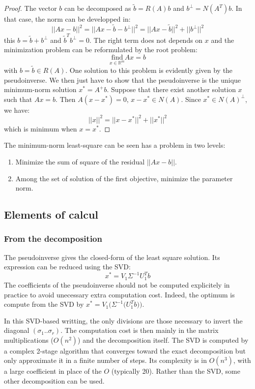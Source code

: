 \documentclass{book}
\begin{document}
\begin{proof}
The vector $b$ can be decomposed as $\tilde b = R(A) b$ and  $b^\perp = N(A^T) b$. In that case, the norm can be developped in:
$$ || A x - b ||^2 = || A x - \tilde{b} - b^\perp ||^2 = || A x - \tilde{b} ||^2 + || b^\perp ||^2 $$
this $b=\tilde{b}+b^\perp$ and $\tilde{b}^T b^\perp=0$. The right term does not depends on $x$ and the minimization problem can be reformulated by the root problem:
$$ \underset{x\in\mathbb{R}^m}{\textrm{find}}   A x = b$$
with $b = \tilde b \in R(A)$. One solution to this problem is evidently given by the pseudoinverse. We then just have to show that the pseudoinverse is the unique minimum-norm solution $x^* = A^+ b$. Suppose that there exist another solution $x$ such that $Ax=b$. Then $A(x-x^*) = 0$, \mie $x-x^* \in N(A)$. Since $x^* \in N(A)^\perp$, we have:
$$ || x ||^2 = || x-x^*  ||^2 + || x^* ||^2 $$ 
which is minimum when $x=x^*$.
\end{proof}

The minimum-norm least-square can be seen has a problem in two levels:
\begin{enumerate}
\item Minimize the sum of square of the residual $||Ax-b||$.
\item Among the set of solution of the first objective, minimize the parameter norm.
\end{enumerate}

\subsection{Elements of calcul}

\subsubsection{From the decomposition}

The pseudoinverse gives the closed-form of the least square solution. Its expression can be reduced using the SVD:
$$ x^* = V_1 \Sigma^{-1} U_1^T b$$
The coefficients of the pseudoinverse should not be computed explicitely in practice to avoid unecessary extra computation cost. Indeed, the optimum is compute from the SVD by $x^* = V_1 \Big( \Sigma^{-1} \big( U_1^T b \big) \Big)$.

In this SVD-based writting, the only divisions are those necessary to invert the diagonal $(\sigma_1 .. \sigma_r)$. The computation cost is then mainly in the matrix multiplications ($O(n^2)$) and the decomposition itself. The SVD is computed by a complex 2-stage algorithm that converges toward the exact decomposition but only approximate it in a finite number of steps. Its complexity is in $O(n^3)$, with a large coefficient in place of the $O$ (typically 20). Rather than the SVD, some other decomposition can be used.
\end{document}
